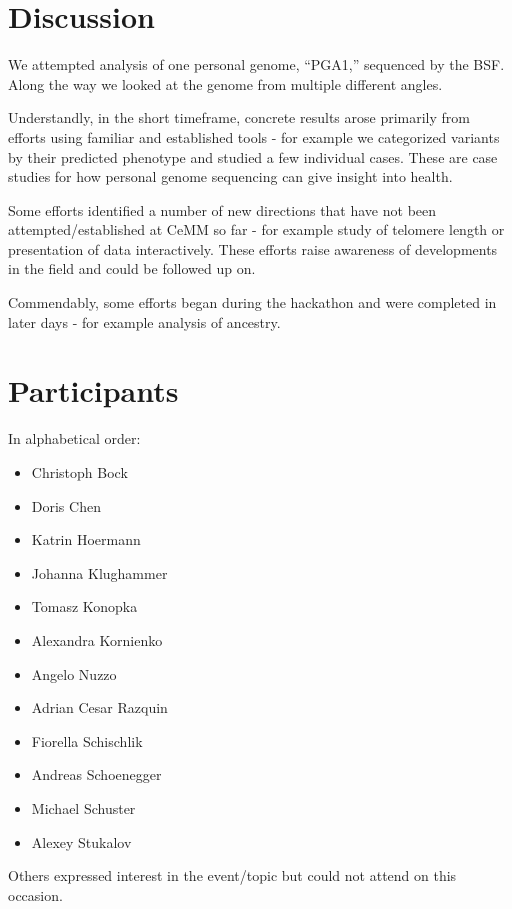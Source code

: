 \documentclass[a4paper,11pt]{TKnotes}
\begin{document}
\clearpage
\section{Discussion}

We attempted analysis of one personal genome, ``PGA1,'' sequenced by the BSF. Along the way we looked at the genome from multiple different angles. 

Understandly, in the short timeframe, concrete results arose primarily from efforts using familiar and established tools - for example we categorized variants by their predicted phenotype and studied a few individual cases. These are case studies for how personal genome sequencing can give insight into health.

Some efforts identified a number of new directions that have not been attempted/established at CeMM so far - for example study of telomere length or presentation of data interactively. These efforts raise awareness of developments in the field and could be followed up on.

Commendably, some efforts began during the hackathon and were completed in later days - for example analysis of ancestry.



\section{Participants}

In alphabetical order:

\begin{itemize}
\vspace*{-0.22cm}\item[] Christoph Bock
\vspace*{-0.22cm}\item[] Doris Chen
\vspace*{-0.22cm}\item[] Katrin Hoermann
\vspace*{-0.22cm}\item[] Johanna Klughammer
\vspace*{-0.22cm}\item[] Tomasz Konopka
\vspace*{-0.22cm}\item[] Alexandra Kornienko
\vspace*{-0.22cm}\item[] Angelo Nuzzo
\vspace*{-0.22cm}\item[] Adrian Cesar Razquin
\vspace*{-0.22cm}\item[] Fiorella Schischlik
\vspace*{-0.22cm}\item[] Andreas Schoenegger
\vspace*{-0.22cm}\item[] Michael Schuster
\vspace*{-0.22cm}\item[] Alexey Stukalov
\end{itemize}
Others expressed interest in the event/topic but could not attend on this occasion.
\end{document}
